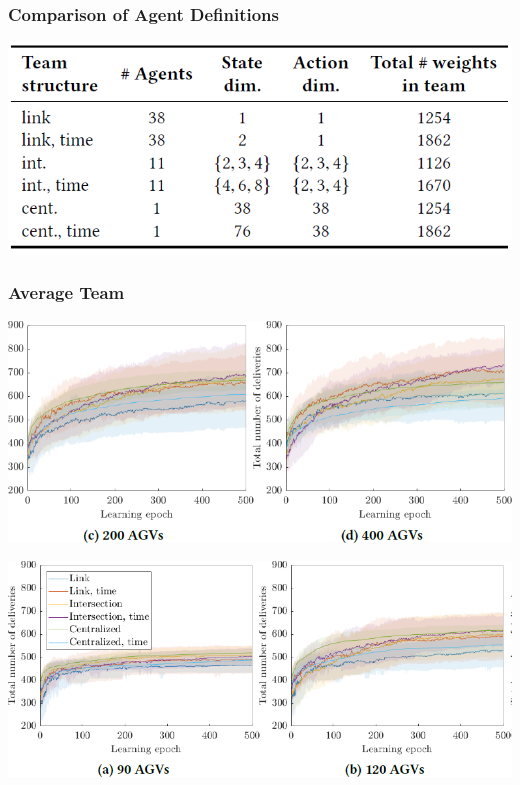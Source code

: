 \documentclass{beamer}
\begin{document}
	\begin{frame}
	\frametitle{Comparison of Agent Definitions}
	\begin{center}
    \includegraphics[width=1\textwidth]{comp.png}
	\end{center}
	\end{frame}
	
		\begin{frame}
	\frametitle{Average Team}
	\begin{center}
    \includegraphics[height=0.425\textheight ]{graph1.png}
    
    
     \includegraphics[height=0.425\textheight]{graph2.png}
     \end{center}
	\end{frame}
	
\end{document}
